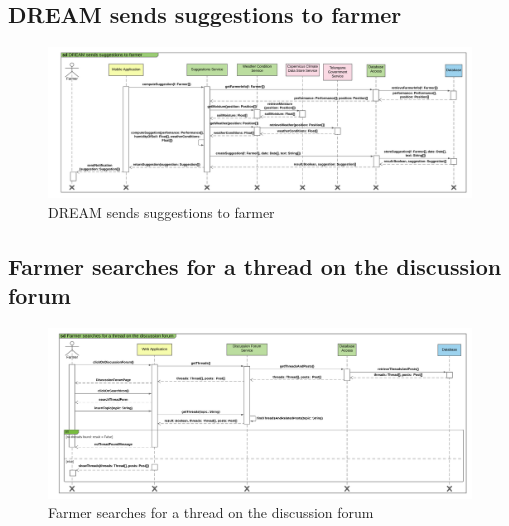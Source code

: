 \subsection{DREAM sends suggestions to farmer}

\newpage
\begin{landscape}
\begin{figure}[h]
\vspace*{-2cm}
\noindent
\centering
\centerline{\includegraphics[scale= 0.108]{./Images/Sequence diagram/DREAM sends suggestions to farmer.png}}
    \caption{DREAM sends suggestions to farmer}
    \vspace*{-12cm}
\end{figure}
\fillandplacepagenumber
\end{landscape}

\subsection{Farmer searches for a thread on the discussion forum}

\newpage
\begin{landscape}
\begin{figure}[h]
\vspace*{-2cm}
\noindent
\centering
\centerline{\includegraphics[scale= 0.108]{./Images/Sequence diagram/Farmer searches for a thread on the discussion forum.png}}
    \caption{Farmer searches for a thread on the discussion forum}
    \vspace*{-12cm}
\end{figure}
\fillandplacepagenumber
\end{landscape}

